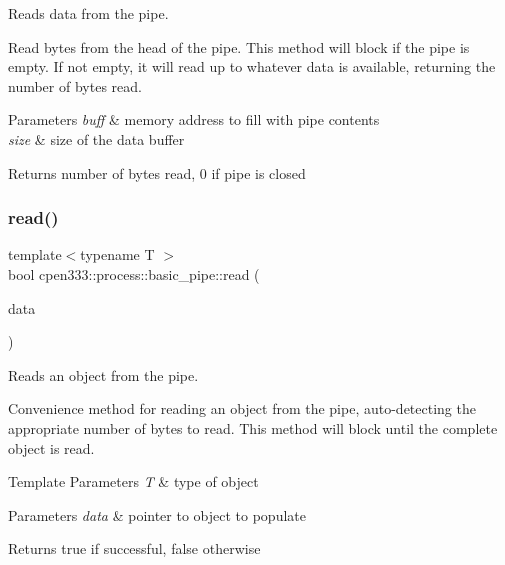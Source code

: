 Reads data from the pipe. 

Read bytes from the head of the pipe. This method will block if the pipe is empty. If not empty, it will read up to whatever data is available, returning the number of bytes read.


\begin{DoxyParams}{Parameters}
{\em buff} & memory address to fill with pipe contents \\
\hline
{\em size} & size of the data buffer \\
\hline
\end{DoxyParams}
\begin{DoxyReturn}{Returns}
number of bytes read, 0 if pipe is closed 
\end{DoxyReturn}
\mbox{\label{classcpen333_1_1process_1_1basic__pipe_a61e5b27ee80ba854cbacbfe82b1675e8}} 
\subsubsection{\texorpdfstring{read()}{read()}\hspace{0.1cm}{\footnotesize\ttfamily [2/2]}}
{\footnotesize\ttfamily template$<$typename T $>$ \\
bool cpen333\+::process\+::basic\+\_\+pipe\+::read (\begin{DoxyParamCaption}\item[{T $\ast$}]{data }\end{DoxyParamCaption})\hspace{0.3cm}{\ttfamily [inline]}}



Reads an object from the pipe. 

Convenience method for reading an object from the pipe, auto-\/detecting the appropriate number of bytes to read. This method will block until the complete object is read.


\begin{DoxyTemplParams}{Template Parameters}
{\em T} & type of object \\
\hline
\end{DoxyTemplParams}

\begin{DoxyParams}{Parameters}
{\em data} & pointer to object to populate \\
\hline
\end{DoxyParams}
\begin{DoxyReturn}{Returns}
true if successful, false otherwise 
\end{DoxyReturn}
\mbox{\label{classcpen333_1_1process_1_1basic__pipe_a72b4577f57f59f930b784ccc972805da}} 
